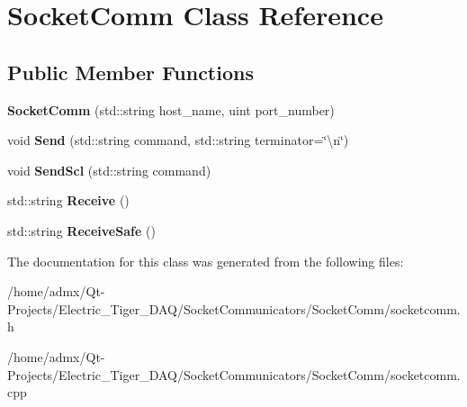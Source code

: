 \hypertarget{class_socket_comm}{\section{Socket\+Comm Class Reference}
\label{class_socket_comm}
}
\subsection*{Public Member Functions}
\begin{DoxyCompactItemize}
\item 
\hypertarget{class_socket_comm_a91848bdb00c5e2fa1d83bfabf2e83e23}{{\bfseries Socket\+Comm} (std\+::string host\+\_\+name, uint port\+\_\+number)}\label{class_socket_comm_a91848bdb00c5e2fa1d83bfabf2e83e23}

\item 
\hypertarget{class_socket_comm_ad76f9593ad58c8899878d2b08ac61266}{void {\bfseries Send} (std\+::string command, std\+::string terminator=\char`\"{}\textbackslash{}n\char`\"{})}\label{class_socket_comm_ad76f9593ad58c8899878d2b08ac61266}

\item 
\hypertarget{class_socket_comm_a9cda97b2727f4a47ef5f7d728737521b}{void {\bfseries Send\+Scl} (std\+::string command)}\label{class_socket_comm_a9cda97b2727f4a47ef5f7d728737521b}

\item 
\hypertarget{class_socket_comm_a854e742d1c9f998f7f0981fe3c77c84e}{std\+::string {\bfseries Receive} ()}\label{class_socket_comm_a854e742d1c9f998f7f0981fe3c77c84e}

\item 
\hypertarget{class_socket_comm_a9c09a1bf47807b3465944a5555a61cec}{std\+::string {\bfseries Receive\+Safe} ()}\label{class_socket_comm_a9c09a1bf47807b3465944a5555a61cec}

\end{DoxyCompactItemize}


The documentation for this class was generated from the following files\+:\begin{DoxyCompactItemize}
\item 
/home/admx/\+Qt-\/\+Projects/\+Electric\+\_\+\+Tiger\+\_\+\+D\+A\+Q/\+Socket\+Communicators/\+Socket\+Comm/socketcomm.\+h\item 
/home/admx/\+Qt-\/\+Projects/\+Electric\+\_\+\+Tiger\+\_\+\+D\+A\+Q/\+Socket\+Communicators/\+Socket\+Comm/socketcomm.\+cpp\end{DoxyCompactItemize}
